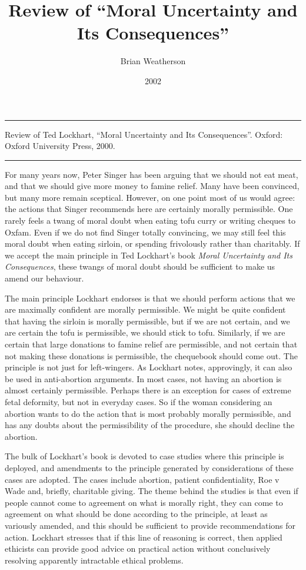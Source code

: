 \documentclass[
  10pt,
  letterpaper,
  DIV=11,
  numbers=noendperiod,
  twoside]{scrartcl}
\title{Review of ``Moral Uncertainty and Its Consequences''}
\author{Brian Weatherson}
\date{2002}
\renewenvironment{abstract}
 {\vspace{-1.25cm}
 \quotation\small\noindent\rule{\linewidth}{.5pt}\par\smallskip
 \noindent }
 {\par\noindent\rule{\linewidth}{.5pt}\endquotation}
\begin{document}
\maketitle
\begin{abstract}
Review of Ted Lockhart, ``Moral Uncertainty and Its Consequences''.
Oxford: Oxford University Press, 2000.
\end{abstract}


For many years now, Peter Singer has been arguing that we should not eat
meat, and that we should give more money to famine relief. Many have
been convinced, but many more remain sceptical. However, on one point
most of us would agree: the actions that Singer recommends here are
certainly morally permissible. One rarely feels a twang of moral doubt
when eating tofu curry or writing cheques to Oxfam. Even if we do not
find Singer totally convincing, we may still feel this moral doubt when
eating sirloin, or spending frivolously rather than charitably. If we
accept the main principle in Ted Lockhart's book \emph{Moral Uncertainty
and Its Consequences}, these twangs of moral doubt should be sufficient
to make us amend our behaviour.

The main principle Lockhart endorses is that we should perform actions
that we are maximally confident are morally permissible. We might be
quite confident that having the sirloin is morally permissible, but if
we are not certain, and we are certain the tofu is permissible, we
should stick to tofu. Similarly, if we are certain that large donations
to famine relief are permissible, and not certain that not making these
donations is permissible, the chequebook should come out. The principle
is not just for left-wingers. As Lockhart notes, approvingly, it can
also be used in anti-abortion arguments. In most cases, not having an
abortion is almost certainly permissible. Perhaps there is an exception
for cases of extreme fetal deformity, but not in everyday cases. So if
the woman considering an abortion wants to do the action that is most
probably morally permissible, and has any doubts about the
permissibility of the procedure, she should decline the abortion.

The bulk of Lockhart's book is devoted to case studies where this
principle is deployed, and amendments to the principle generated by
considerations of these cases are adopted. The cases include abortion,
patient confidentiality, Roe v Wade and, briefly, charitable giving. The
theme behind the studies is that even if people cannot come to agreement
on what is morally right, they can come to agreement on what should be
done according to the principle, at least as variously amended, and this
should be sufficient to provide recommendations for action. Lockhart
stresses that if this line of reasoning is correct, then applied
ethicists can provide good advice on practical action without
conclusively resolving apparently intractable ethical problems.
\end{document}
